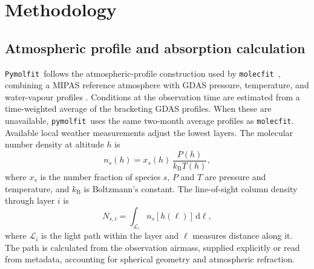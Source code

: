 \documentclass{aa}
\newcommand{\molecfit}{{\texttt{molecfit}}}
\newcommand{\Pymolfit}{\texttt{Pymolfit}}
\newcommand{\pymolfit}{\texttt{pymolfit}}
\begin{document}

\section{Methodology}
\subsection{Atmospheric profile and absorption calculation}

\Pymolfit\ follows the atmospheric-profile construction used by \molecfit\ \citep{MOLECFIT1}, combining a MIPAS reference atmosphere \citep{MIPAS_PROFILE} with GDAS pressure, temperature, and water-vapour profiles \citep{GDAS}. Conditions at the observation time are estimated from a time-weighted average of the bracketing GDAS profiles. When these are unavailable, \pymolfit\ uses the same two-month average profiles as \molecfit. Available local weather measurements adjust the lowest layers. The molecular number density at altitude \(h\) is
\begin{equation} n_s(h) = x_s(h)\,\frac{P(h)}{k_{\mathrm B}T(h)}, \end{equation}
where \(x_s\) is the number fraction of species \(s\), \(P\) and \(T\) are pressure and temperature, and \(k_{\mathrm B}\) is Boltzmann's constant. The line-of-sight column density through layer \(i\) is
\begin{equation} N_{s,i} = \int_{\mathcal{L}_i} n_s[h(\ell)]\,\mathrm{d}\ell, \end{equation}
where \(\mathcal{L}_i\) is the light path within the layer and \(\ell\) measures distance along it. The path is calculated from the observation airmass, supplied explicitly or read from metadata, accounting for spherical geometry and atmospheric refraction.
\end{document}
